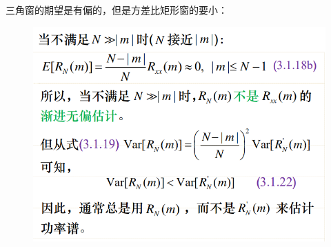 \documentclass[UTF8]{ctexart} %
\begin{document}
				三角窗的期望是有偏的，但是方差比矩形窗的要小：
				\begin{figure}[H]
					\centering\includegraphics[scale=0.4]{91.png}
				\end{figure}
\end{document}
